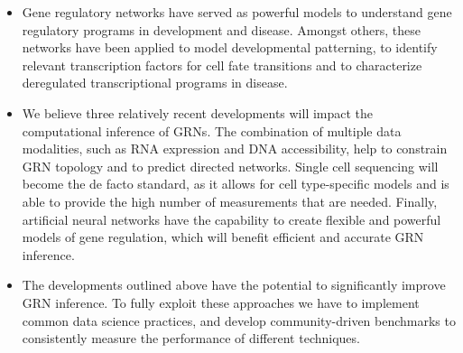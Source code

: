 \begin{itemize}
    \item Gene regulatory networks have served as powerful models to understand gene regulatory programs in development and disease. Amongst others, these networks have been applied to model developmental patterning, to identify relevant transcription factors for cell fate transitions and to characterize deregulated transcriptional programs in disease.
    \item We believe three relatively recent developments will impact the computational inference of GRNs. The combination of multiple data modalities, such as RNA expression and DNA accessibility, help to constrain GRN topology and to predict directed networks. Single cell sequencing will become the de facto standard, as it allows for cell type-specific models and is able to provide the high number of measurements that are needed. Finally, artificial neural networks have the capability to create flexible and powerful models of gene regulation, which will benefit efficient and accurate GRN inference.
    \item The developments outlined above have the potential to significantly improve GRN inference. To fully exploit these approaches we have to implement common data science practices, and develop community-driven benchmarks to consistently measure the performance of different techniques.
\end{itemize}






